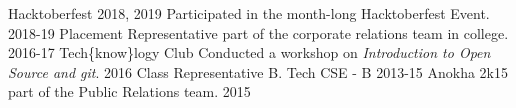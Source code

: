 \begin{cvhonors}
  \cvhonor
    {Hacktoberfest 2018, 2019}
    {Participated in the month-long Hacktoberfest Event.}
    {\empty}
    {2018-19}
  \cvhonor
    {Placement Representative}
    {part of the corporate relations team in college.}
    {\empty}
    {2016-17}
  \cvhonor
    {Tech\{know\}logy Club}
    {Conducted a workshop on \textit{Introduction to Open Source and git}.}
    {}
    {2016}
 \cvhonor
    {Class Representative}
    {B. Tech CSE - B}
    {\empty}
    {2013-15}
  \cvhonor
    {Anokha 2k15}
    {part of the Public Relations team.}
    {}
    {2015}
\end{cvhonors}